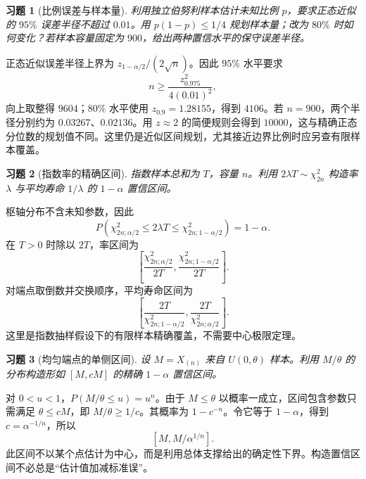 \documentclass[UTF8,12pt,a4paper,fontset=fandol]{ctexart}
\newtheorem{exercise}{习题}[section]
\begin{document}
\begin{exercise}[比例误差与样本量]\label{q:M-C22-3}
利用独立伯努利样本估计未知比例 $p$，要求正态近似的 $95\%$ 误差半径不超过 $0.01$。用 $p(1-p)\le1/4$ 规划样本量；改为 $80\%$ 时如何变化？若样本容量固定为 $900$，给出两种置信水平的保守误差半径。\par{}
\end{exercise}

\begin{solve}\label{a:M-C22-3}正态近似误差半径上界为 $z_{1-\alpha/2}/(2\sqrt n)$。因此 $95\%$ 水平要求\[n\ge\frac{z_{0.975}^2}{4(0.01)^2},\]向上取整得 $9604$；$80\%$ 水平使用 $z_{0.9}=1.28155$，得到 $4106$。若 $n=900$，两个半径分别约为 $0.03267$、$0.02136$。用 $z\approx2$ 的简便规则会得到 $10000$，这与精确正态分位数的规划值不同。这里仍是近似区间规划，尤其接近边界比例时应另查有限样本覆盖。\end{solve}

\begin{exercise}[指数率的精确区间]\label{q:B13.1}
指数样本总和为 $T$，容量 $n$。利用 $2\lambda T\sim\chi^2_{2n}$ 构造率 $\lambda$ 与平均寿命 $1/\lambda$ 的 $1-\alpha$ 置信区间。\par{}
\end{exercise}

\begin{solve}\label{a:B13.1}枢轴分布不含未知参数，因此\[P\left(\chi^2_{2n;\alpha/2}\le2\lambda T\le\chi^2_{2n;1-\alpha/2}\right)=1-\alpha.\]在 $T>0$ 时除以 $2T$，率区间为\[\left[\frac{\chi^2_{2n;\alpha/2}}{2T},\frac{\chi^2_{2n;1-\alpha/2}}{2T}\right].\]对端点取倒数并交换顺序，平均寿命区间为\[\left[\frac{2T}{\chi^2_{2n;1-\alpha/2}},\frac{2T}{\chi^2_{2n;\alpha/2}}\right].\]这里是指数抽样假设下的有限样本精确覆盖，不需要中心极限定理。\end{solve}

\begin{exercise}[均匀端点的单侧区间]\label{q:B13.2}
设 $M=X_{(n)}$ 来自 $U(0,\theta)$ 样本。利用 $M/\theta$ 的分布构造形如 $[M,cM]$ 的精确 $1-\alpha$ 置信区间。\par{}
\end{exercise}

\begin{solve}\label{a:B13.2}对 $0<u<1$，$P(M/\theta\le u)=u^n$。由于 $M\le\theta$ 以概率一成立，区间包含参数只需满足 $\theta\le cM$，即 $M/\theta\ge1/c$。其概率为 $1-c^{-n}$。令它等于 $1-\alpha$，得到 $c=\alpha^{-1/n}$，所以\[[M,M/\alpha^{1/n}].\]此区间不以某个点估计为中心，而是利用总体支撑给出的确定性下界。构造置信区间不必总是“估计值加减标准误”。\end{solve}
\end{document}
